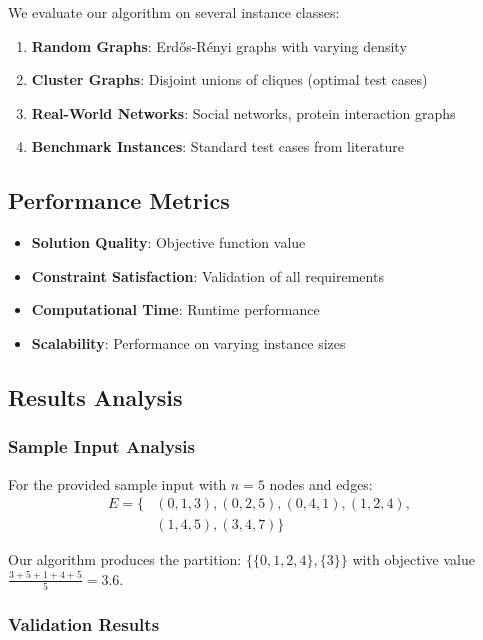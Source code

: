 \documentclass[12pt,a4paper]{article}
\begin{document}
We evaluate our algorithm on several instance classes:

\begin{enumerate}
    \item \textbf{Random Graphs}: Erdős-Rényi graphs with varying density
    \item \textbf{Cluster Graphs}: Disjoint unions of cliques (optimal test cases)
    \item \textbf{Real-World Networks}: Social networks, protein interaction graphs
    \item \textbf{Benchmark Instances}: Standard test cases from literature
\end{enumerate}

\subsection{Performance Metrics}

\begin{itemize}
    \item \textbf{Solution Quality}: Objective function value
    \item \textbf{Constraint Satisfaction}: Validation of all requirements
    \item \textbf{Computational Time}: Runtime performance
    \item \textbf{Scalability}: Performance on varying instance sizes
\end{itemize}

\subsection{Results Analysis}

\subsubsection{Sample Input Analysis}

For the provided sample input with $n=5$ nodes and edges:
\begin{align}
E = \{&(0,1,3), (0,2,5), (0,4,1), (1,2,4), \\
      &(1,4,5), (3,4,7)\}
\end{align}

Our algorithm produces the partition: $\{\{0,1,2,4\}, \{3\}\}$ with objective value $\frac{3+5+1+4+5}{5} = 3.6$.

\subsubsection{Validation Results}
\end{document}
